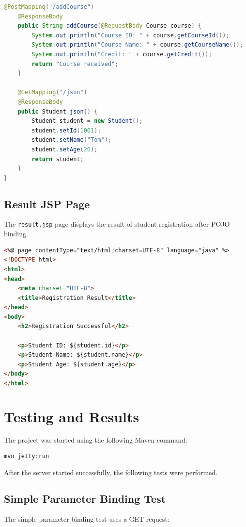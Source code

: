 \documentclass[12pt,a4paper]{article}
\begin{document}
\begin{lstlisting}[caption={StudentController.java},label={lst:controller},language=Java]
    @PostMapping("/addCourse")
    @ResponseBody
    public String addCourse(@RequestBody Course course) {
        System.out.println("Course ID: " + course.getCourseId());
        System.out.println("Course Name: " + course.getCourseName());
        System.out.println("Credit: " + course.getCredit());
        return "Course received";
    }

    @GetMapping("/json")
    @ResponseBody
    public Student json() {
        Student student = new Student();
        student.setId(1001);
        student.setName("Tom");
        student.setAge(20);
        return student;
    }
}
\end{lstlisting}

\subsection{Result JSP Page}

The \texttt{result.jsp} page displays the result of student registration after POJO binding.

\begin{lstlisting}[caption={result.jsp},label={lst:resultjsp},language=HTML]
<%@ page contentType="text/html;charset=UTF-8" language="java" %>
<!DOCTYPE html>
<html>
<head>
    <meta charset="UTF-8">
    <title>Registration Result</title>
</head>
<body>
    <h2>Registration Successful</h2>

    <p>Student ID: ${student.id}</p>
    <p>Student Name: ${student.name}</p>
    <p>Student Age: ${student.age}</p>
</body>
</html>
\end{lstlisting}

\section{Testing and Results}

The project was started using the following Maven command:

\begin{lstlisting}[caption={Running the application}]
mvn jetty:run
\end{lstlisting}

After the server started successfully, the following tests were performed.

\subsection{Simple Parameter Binding Test}

The simple parameter binding test uses a GET request:
\end{document}
